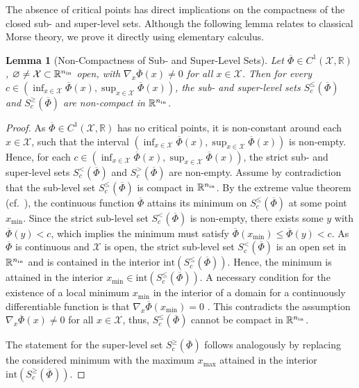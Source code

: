 \documentclass[10pt]{article}
\newtheorem{lemma}[theorem]{Lemma}
\theoremstyle{definition}
\numberwithin{equation}{section}
\newcommand{\R}{\mathbb{R}}
\newcommand*{\nin}{n_\textup{in}}
\begin{document}
The absence of critical points has direct implications on the compactness of the closed sub- and super-level sets. Although the following lemma relates to classical Morse theory, we prove it directly using elementary calculus.

\begin{lemma}[Non-Compactness of Sub- and Super-Level Sets] \label{lem:levelsets_noncompact}
    Let $\overline{\Phi} \in C^1(\mathcal{X},\R)$, $\varnothing \neq \mathcal{X}\subset \R^{\nin}$ open, with $\nabla_x\overline{\Phi}(x) \neq 0$ for all $x\in \mathcal{X}$. Then for every $c \in  (\inf_{x \in \mathcal{X}} \overline{\Phi}(x),\sup_{x \in \mathcal{X}} \overline{\Phi}(x))$, the sub- and super-level sets $S_c^{\leq}(\overline{\Phi})$ and $S_c^{\geq}(\overline{\Phi})$ are non-compact in $\R^{\nin}$.
\end{lemma}

\begin{proof}
    As $\overline{\Phi} \in C^1(\mathcal{X},\R)$ has no critical points, it is non-constant around each $x\in \mathcal{X}$, such that the interval $ (\inf_{x \in \mathcal{X}} \overline{\Phi}(x),\sup_{x \in \mathcal{X}} \overline{\Phi}(x))$ is non-empty. Hence, for each $c \in  (\inf_{x \in \mathcal{X}} \overline{\Phi}(x),\sup_{x \in \mathcal{X}} \overline{\Phi}(x))$, the strict sub- and super-level sets $S_c^{<}(\overline{\Phi})$ and $S_c^{>}(\overline{\Phi})$ are non-empty. 
    Assume by contradiction that the sub-level set $S_c^{\leq}(\overline{\Phi})$ is compact in $\R^{\nin}$. By the extreme value theorem (cf.~\cite{Rudin1976}), the continuous function $\overline{\Phi}$ attains its minimum on $S_c^{\leq}(\overline{\Phi})$ at some point $x_{\min}$. Since the strict sub-level set $S_c^{<}(\overline{\Phi})$ is non-empty, there exists some $y$ with $\overline{\Phi}(y) < c$, which implies the minimum must satisfy $\overline{\Phi}(x_{\min}) \leq \overline{\Phi}(y) < c$.
    As $\overline{\Phi}$ is continuous and $\mathcal{X}$ is open, the strict sub-level set $S_c^{<}(\overline{\Phi})$ is an open set in $\R^{\nin}$ and is contained in the interior $\text{int}(S_c^{\leq}(\overline{\Phi}))$. Hence, the minimum is attained in the interior $x_{\min} \in \text{int}(S_c^{\leq}(\overline{\Phi}))$. A necessary condition for the existence of a local minimum $x_\text{min}$ in the interior of a domain for a continuously differentiable function is that $\nabla_x \overline{\Phi}(x_\text{min}) = 0$ \cite{Forster2017}. This contradicts the assumption $\nabla_x\overline{\Phi}(x) \neq 0$ for all $x \in \mathcal{X}$, thus, $S_c^{\leq}(\overline{\Phi})$ cannot be compact in $\R^{\nin}$.
    
    The statement for the super-level set $S_c^{\geq}(\overline{\Phi})$ follows analogously by replacing the considered minimum with the maximum $x_{\max}$ attained in the interior $\text{int}(S_c^{\geq}(\overline{\Phi}))$. 
\end{proof}
\end{document}
